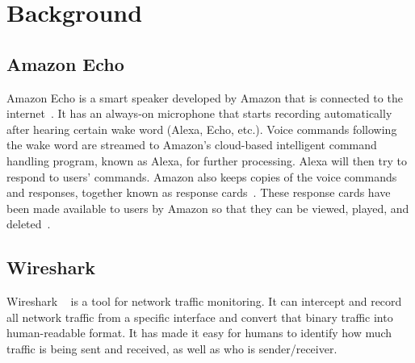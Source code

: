 \section{Background}
\subsection{Amazon Echo}
Amazon Echo is a smart speaker developed by Amazon that is connected to the internet~\cite{wikipedia_2019}. It has an always-on microphone that starts recording automatically after hearing certain wake word (Alexa, Echo, etc.). Voice commands following the wake word are streamed to Amazon's cloud-based intelligent command handling program, known as Alexa, for further processing. Alexa will then try to respond to users' commands. Amazon also keeps copies of the voice commands and responses, together known as response cards~\cite{ford2019alexa}. These response cards have been made available to users by Amazon so that they can be viewed, played, and deleted~\cite{amazon_2010}.

\subsection{Wireshark}
Wireshark ~\cite{wireshark_wiki} is a tool for network traffic monitoring. It can intercept and record all network traffic from a specific interface and convert that binary traffic into human-readable format. It has made it easy for humans to identify how much traffic is being sent and received, as well as who is sender/receiver.